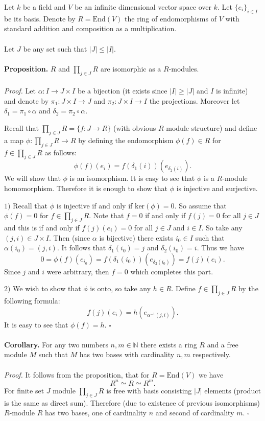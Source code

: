 \documentclass[12pt]{article}
\begin{document}
Let $k$ be a field and $V$ be an infinite dimensional vector space over $k$. Let $\{e_i\}_{i\in I}$ be its basis. Denote by $R=\mathrm{End}(V)$ the ring of endomorphisms of $V$ with standard addition and composition as a multiplication.\\ \\
Let $J$ be any set such that $|J|\leq |I|$. \\ \\ 
\textbf{Proposition.} $R$ and $\prod_{j\in J}R$ are isomorphic as a $R$-modules.\\ \\ 
\textit{Proof.} Let $\alpha:I\rightarrow J\times I$ be a bijection (it exists since $|I|\geq |J|$ and $I$ is infinite) and denote by $\pi_1:J\times I\rightarrow J$ and $\pi_2:J\times I\rightarrow I$ the projections. Moreover let $\delta_1=\pi_1 \circ \alpha$ and $\delta_2=\pi_2 \circ \alpha$. 

Recall that $\prod_{j\in J}R = \{f:J\to R\}$ (with obvious $R$-module structure) and define a map $\phi:\prod_{j\in J}R\rightarrow R$ by defining the endomorphism $\phi(f)\in R$ for $f\in\prod_{j\in J}R$ as follows:
$$\phi(f)(e_i)=f(\delta_1 (i))(e_{\delta_2 (i)}).$$ $ $ \\ 
We will show that $\phi$ is an isomorphism. It is easy to see that $\phi$ is a $R$-module homomorphism. Therefore it is enough to show that $\phi$ is injective and surjective.

$1)$ Recall that $\phi$ is injective if and only if $\mathrm{ker}(\phi)=0$. So assume that $\phi(f)=0$ for $f\in\prod_{j\in J}R$. Note that $f=0$ if and only if $f(j)=0$ for all $j\in J$ and this is if and only if $f(j)(e_{i})=0$ for all $j\in J$ and $i\in I$. So take any $(j,i)\in J\times I$. Then (since $\alpha$ is bijective) there exists $i_0\in I$ such that $\alpha(i_0)=(j,i)$. It follows that $\delta_1 (i_0)=j$ and $\delta_2 (i_0)=i$. Thus we have
$$0=\phi(f)(e_{i_{0}})=f(\delta_1 (i_0))(e_{\delta_2 (i_0)})=f(j)(e_i).$$
Since $j$ and $i$ were arbitrary, then $f=0$ which completes this part.

$2)$ We wish to show that $\phi$ is onto, so take any $h\in R$. Define $f\in\prod_{j\in J} R$ by the following formula:
$$f(j)(e_i)=h(e_{\alpha^{-1}(j,i)}).$$
It is easy to see that $\phi(f)=h$. $\square$ \\ \\
\textbf{Corollary.} For any two numbers $n,m\in\mathbb{N}$ there exists a ring $R$ and a free module $M$ such that $M$ has two bases with cardinality $n,m$ respectively.\\ \\
\textit{Proof.} It follows from the proposition, that for $R=\mathrm{End}(V)$ we have $$R^{n}\simeq R\simeq R^{m}.$$ For finite set $J$ module $\prod_{j\in J} R$ is free with basis consisting $|J|$ elements (product is the same as direct sum). Therefore (due to existence of previous isomorphisms) $R$-module $R$ has two bases, one of cardinality $n$ and second of cardinality $m$. $\square$
\end{document}
